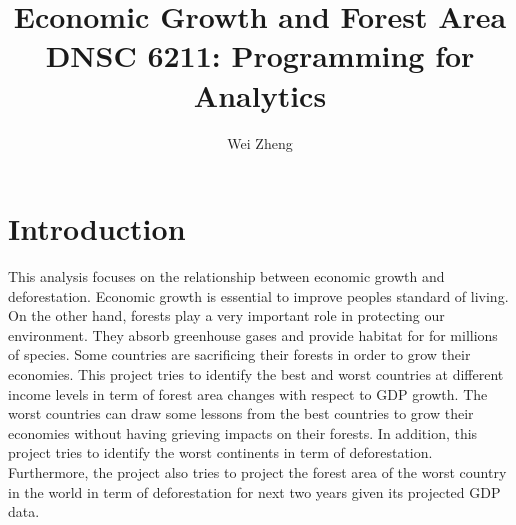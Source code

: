 \documentclass{article}
\title{Economic Growth and Forest Area  \\ \small{DNSC 6211: Programming for Analytics}}
\author{
	Wei Zheng \\
}
\date{}
\begin{document}
\maketitle


\pagebreak
\tableofcontents


\pagebreak

%
%
\section{Introduction}
\label{introduction}
This analysis focuses on the relationship between economic growth and deforestation. Economic growth is essential to improve people\textquotesingle s standard of living. On the other hand, forests play a very important role in protecting our environment. They absorb greenhouse gases and provide habitat for for millions of species.  Some countries are sacrificing their forests in order to grow their economies. This project tries to identify the best and worst countries at different income levels in term of forest area changes with respect to GDP growth. The worst countries can draw some lessons from the best countries to grow their economies without having grieving impacts on their forests. In addition, this project tries to identify the worst continents in term of deforestation.  Furthermore, the project also tries to project the forest area of the worst country in the world in term of deforestation for next two years given its projected GDP data. 
\end{document}
